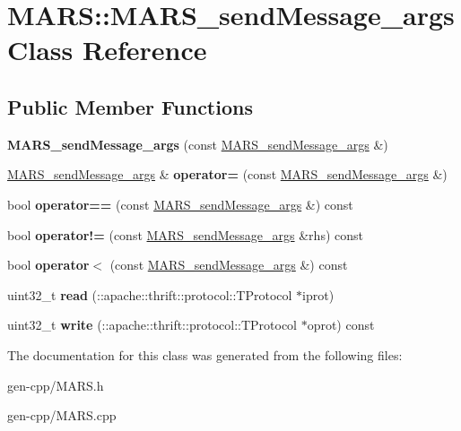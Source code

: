\hypertarget{classMARS_1_1MARS__sendMessage__args}{}\section{M\+A\+RS\+:\+:M\+A\+R\+S\+\_\+send\+Message\+\_\+args Class Reference}
\label{classMARS_1_1MARS__sendMessage__args}
\subsection*{Public Member Functions}
\begin{DoxyCompactItemize}
\item 
\mbox{\label{classMARS_1_1MARS__sendMessage__args_ab8345cf8d31ef60e2eedf8f0c3a5a1bb}} 
{\bfseries M\+A\+R\+S\+\_\+send\+Message\+\_\+args} (const \hyperlink{classMARS_1_1MARS__sendMessage__args}{M\+A\+R\+S\+\_\+send\+Message\+\_\+args} \&)
\item 
\mbox{\label{classMARS_1_1MARS__sendMessage__args_a89d0a8ad42e909fea721d9f61393e25a}} 
\hyperlink{classMARS_1_1MARS__sendMessage__args}{M\+A\+R\+S\+\_\+send\+Message\+\_\+args} \& {\bfseries operator=} (const \hyperlink{classMARS_1_1MARS__sendMessage__args}{M\+A\+R\+S\+\_\+send\+Message\+\_\+args} \&)
\item 
\mbox{\label{classMARS_1_1MARS__sendMessage__args_ab67aff64e53f120300c9781a8497012e}} 
bool {\bfseries operator==} (const \hyperlink{classMARS_1_1MARS__sendMessage__args}{M\+A\+R\+S\+\_\+send\+Message\+\_\+args} \&) const
\item 
\mbox{\label{classMARS_1_1MARS__sendMessage__args_ab084808d4645048b3a2c1ef43f580dab}} 
bool {\bfseries operator!=} (const \hyperlink{classMARS_1_1MARS__sendMessage__args}{M\+A\+R\+S\+\_\+send\+Message\+\_\+args} \&rhs) const
\item 
\mbox{\label{classMARS_1_1MARS__sendMessage__args_a47f82ef9b45a670959dcc13d8a426d0a}} 
bool {\bfseries operator$<$} (const \hyperlink{classMARS_1_1MARS__sendMessage__args}{M\+A\+R\+S\+\_\+send\+Message\+\_\+args} \&) const
\item 
\mbox{\label{classMARS_1_1MARS__sendMessage__args_a66a0dc158b7d635d9e0a65e8ddbf0db1}} 
uint32\+\_\+t {\bfseries read} (\+::apache\+::thrift\+::protocol\+::\+T\+Protocol $\ast$iprot)
\item 
\mbox{\label{classMARS_1_1MARS__sendMessage__args_a7cd267dc0535d663880d343c8dd7f083}} 
uint32\+\_\+t {\bfseries write} (\+::apache\+::thrift\+::protocol\+::\+T\+Protocol $\ast$oprot) const
\end{DoxyCompactItemize}


The documentation for this class was generated from the following files\+:\begin{DoxyCompactItemize}
\item 
gen-\/cpp/M\+A\+R\+S.\+h\item 
gen-\/cpp/M\+A\+R\+S.\+cpp\end{DoxyCompactItemize}
